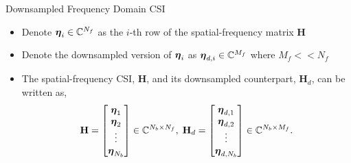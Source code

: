 \documentclass{beamer}
\begin{document}
  \begin{frame}{Downsampled Frequency Domain CSI}
    \begin{itemize}
      \item Denote $\boldsymbol{\eta}_i \in \mathbb{C}^{N_f}$ as the $i$-th row of the spatial-frequency matrix $\mathbf{H}$
      \item Denote the downsampled version of $\boldsymbol{\eta}_i$ as $\boldsymbol{\eta}_{d,i} \in \mathbb{C}^{M_f}$ where $M_f << N_f$
      \item The spatial-frequency CSI, $\mathbf{H}$, and its downsampled counterpart, $\mathbf{H}_d$, can be written as,
      \begin{equation}
        \mathbf{H} = \begin{bmatrix} \boldsymbol{\eta}_1 \\ \boldsymbol{\eta}_2 \\ \vdots \\ \boldsymbol{\eta}_{N_b} \\\end{bmatrix}\in\mathbb{C}^{N_b \times N_f}, \; \mathbf{H}_d = \begin{bmatrix} \boldsymbol{\eta}_{d,1} \\ \boldsymbol{\eta}_{d,2} \\ \vdots \\ \boldsymbol{\eta}_{d,N_b} \\\end{bmatrix}\in\mathbb{C}^{N_b \times M_f}.
      \end{equation}
    \end{itemize}
  \end{frame}



\end{document}
